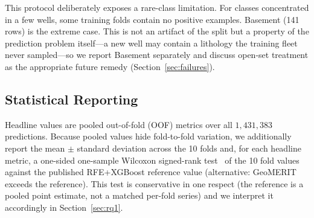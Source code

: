 \documentclass[bdcc,article,submit,pdftex,moreauthors]{Definitions/mdpi}
\begin{document}
This protocol deliberately exposes a rare-class limitation. For classes concentrated in a few
wells, some training folds contain no positive examples. Basement (141 rows) is the extreme
case. This is not an artifact of the split but a property of the prediction problem itself---a
new well may contain a lithology the training fleet never sampled---so we report Basement
separately and discuss open-set treatment as the appropriate future remedy
(Section~\ref{sec:failures}).

\subsection{Statistical Reporting}
\label{sec:stats}
Headline values are pooled out-of-fold (OOF) metrics over all $1{,}431{,}383$ predictions.
Because pooled values hide fold-to-fold variation, we additionally report the mean
$\pm$ standard deviation across the 10 folds and, for each headline metric, a one-sided
one-sample Wilcoxon signed-rank test~\cite{wilcoxon1945} of the 10 fold values against the
published RFE+XGBoost reference value (alternative: GeoMERIT exceeds the reference). This
test is conservative in one respect (the reference is a pooled point estimate, not a matched
per-fold series) and we interpret it accordingly in Section~\ref{sec:rq1}.
\end{document}
